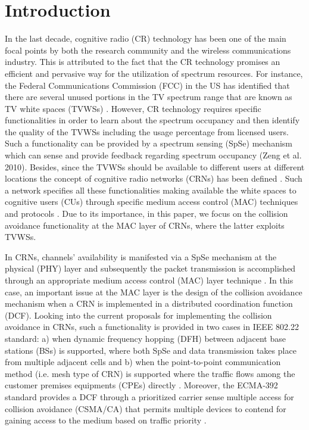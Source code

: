 \documentclass
[journal,11pt,draftclsnofoot,onecolumn,doublespace]{tETN2e}
\begin{document}
\section{Introduction}
In the last decade, cognitive radio (CR) technology has been one of the main focal points by both the research community and the wireless communications industry. This is attributed to the fact that the CR technology promises an efficient and pervasive way for the utilization of spectrum resources. For instance, the Federal Communications Commission (FCC) in the US has identified that there are several unused portions in the TV spectrum range that are known as TV white spaces (TVWSs) \citep{fcc08}. However, CR technology requires specific functionalities in order to learn about the spectrum occupancy and then identify the quality of the TVWSs including the usage percentage from licensed users. Such a functionality can be provided by a spectrum sensing (SpSe) mechanism which can sense and provide feedback regarding spectrum occupancy \citep{yucek09} (Zeng et al. 2010). Besides, since the TVWSs should be available to different users at different locations the concept of cognitive radio networks (CRNs) has been defined \citep{akyildiz06,bixio11}. Such a network specifies all these functionalities making available the white spaces to cognitive users (CUs) through specific medium access control (MAC) techniques and protocols \citep{xiao08}. Due to its importance, in this paper, we focus on the collision avoidance functionality at the MAC layer of CRNs, where the latter exploits TVWSs.

In CRNs, channels’ availability is manifested via a SpSe mechanism at the physical (PHY) layer \citep{foukalas12} and subsequently the packet transmission is accomplished through an appropriate medium access control (MAC) layer technique \citep{cormio09, yan10}. In this case, an important issue at the MAC layer is the design of the collision avoidance mechanism when a CRN is implemented in a distributed coordination function (DCF). Looking into the current proposals for implementing the collision avoidance in CRNs, such a functionality is provided in two cases in IEEE 802.22 standard: a) when dynamic frequency hopping (DFH) between adjacent base stations (BSs) is supported, where both SpSe and data transmission takes place from multiple adjacent cells and b) when the point-to-point communication method (i.e. mesh type of CRN) is supported where the traffic flows among the customer premises equipments (CPEs) directly \citep{ieee06}. Moreover, the ECMA-392 standard provides a DCF through a prioritized carrier sense multiple access for collision avoidance (CSMA/CA) that permits multiple devices to contend for gaining access to the medium based on traffic priority \citep{ecma09}.
\end{document}
